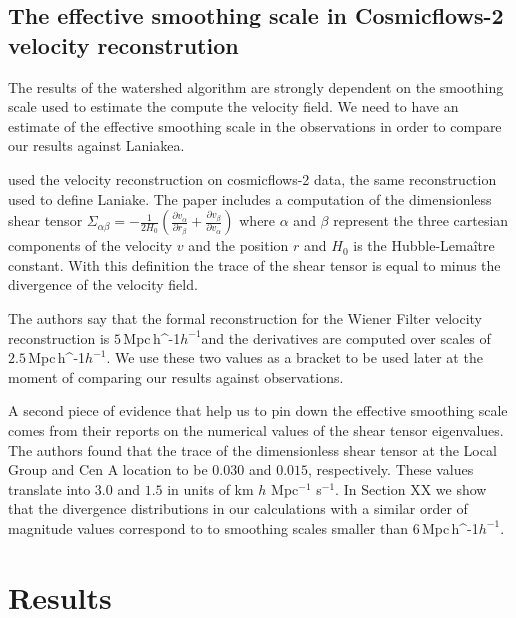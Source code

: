 \documentclass[usenatbib]{mnras}
\newcommand{\Mpch}{\,{\rm Mpc}\,\ifmmode h^{-1}\else $h^{-1}$\fi}
\begin{document}
\subsection{The effective smoothing scale in Cosmicflows-2 velocity reconstrution}

The results of the watershed algorithm are strongly dependent on the
smoothing scale used to estimate the compute the velocity field.
We need to have an estimate of the effective smoothing scale in the observations in order to compare our results against Laniakea.

\cite{2015MNRAS.452.1052L} used the velocity reconstruction on cosmicflows-2 data, the same reconstruction used to define Laniake.
The paper includes a computation of the dimensionless shear tensor $\Sigma_{\alpha\beta}=-\frac{1}{2H_0}\left(\frac{\partial v_\alpha}{\partial r_\beta}+\frac{\partial v_\beta}{\partial v_\alpha}\right)$ where $\alpha$ and $\beta$ represent the three cartesian components of the velocity $v$ and the position $r$ and $H_0$ is the Hubble-Lema\^itre constant.
With this definition the trace of the shear tensor is equal to minus the divergence of the velocity field.


The authors say that the formal reconstruction for the Wiener Filter velocity reconstruction is $5$\Mpch and the derivatives are computed over scales of $2.5$\Mpch. 
We use these two values as a bracket to be used later at the moment of comparing our results against observations.

A second piece of evidence that help us to pin down the effective smoothing scale comes from their reports on the numerical values of the shear tensor eigenvalues.
The authors found that the trace of the dimensionless shear tensor at the Local Group and Cen A location to be $0.030$ and $0.015$, respectively. 
These values translate into $3.0$ and $1.5$ in units of km $h$ Mpc$^{-1}$ s$^{-1}$. 
In Section XX we show that the divergence distributions in our calculations with a similar order of magnitude values correspond to 
to smoothing scales smaller than $6$\Mpch.



\section{Results}
\end{document}
